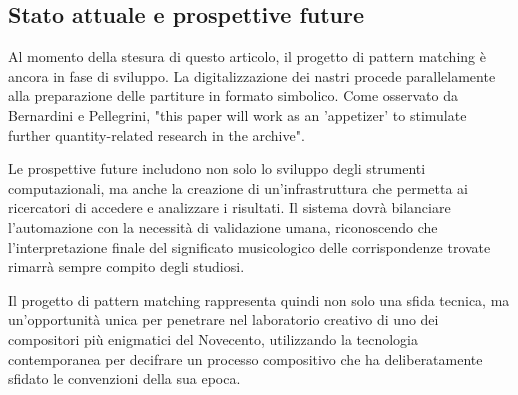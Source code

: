 \subsection{Stato attuale e prospettive future}

Al momento della stesura di questo articolo, il progetto di pattern matching è ancora in fase di sviluppo. La digitalizzazione dei nastri procede parallelamente alla preparazione delle partiture in formato simbolico. Come osservato da Bernardini e Pellegrini, "this paper will work as an 'appetizer' to stimulate further quantity-related research in the archive".

Le prospettive future includono non solo lo sviluppo degli strumenti computazionali, ma anche la creazione di un'infrastruttura che permetta ai ricercatori di accedere e analizzare i risultati. Il sistema dovrà bilanciare l'automazione con la necessità di validazione umana, riconoscendo che l'interpretazione finale del significato musicologico delle corrispondenze trovate rimarrà sempre compito degli studiosi.

Il progetto di pattern matching rappresenta quindi non solo una sfida tecnica, ma un'opportunità unica per penetrare nel laboratorio creativo di uno dei compositori più enigmatici del Novecento, utilizzando la tecnologia contemporanea per decifrare un processo compositivo che ha deliberatamente sfidato le convenzioni della sua epoca.
